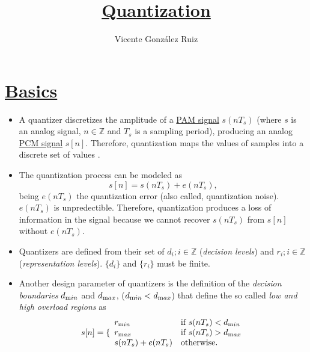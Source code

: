 
\title{\href{https://github.com/vicente-gonzalez-ruiz/quantization}{Quantization}}

\author{Vicente González Ruiz}

\maketitle

\section{\href{https://en.wikipedia.org/wiki/Quantization\_(signal\_processing)}{Basics}}
\begin{itemize}
\tightlist

\item
  A quantizer discretizes the amplitude of a
  \href{https://en.wikipedia.org/wiki/Pulse-amplitude_modulation}{PAM
    signal} \(s(nT_s)\) (where $s$ is an analog signal,
  $n\in{\mathbb{Z}}$ and $T_s$ is a sampling period), producing an
  analog
  \href{https://en.wikipedia.org/wiki/Pulse-code_modulation}{PCM
    signal} $s[n]$. Therefore, quantization maps the 
  values of samples into a discrete set of values
  \cite{vetterli1995wavelets}.

\item
  The quantization process can be modeled as
  \begin{equation}
    s[n] = s(nT_s) + e(nT_s),
  \end{equation}
  being \(e(nT_s)\) the quantization error (also called, quantization
  noise). $e(nT_s)$ is unpredectible. Therefore, quantization produces
  a loss of information in the signal because we cannot recover
  $s(nT_s)$ from $s[n]$ without $e(nT_s)$.

\item
  Quantizers are defined from their set of \(d_i; i\in {\mathbb{Z}}\)
  (\emph{decision levels}) and \(r_i; i\in {\mathbb{Z}}\)
  (\emph{representation levels}). $\{d_i\}$ and $\{r_i\}$ must be
  finite.

\item Another design parameter of quantizers is the definition of the
  \emph{decision boundaries} $d_{\text min}$ and $d_{\text max}$,
  ($d_{\text min}<d_{\text max}$) that define the so called \emph{low
    and high overload regions} as
  \begin{equation}
    s[n] = \{\begin{array}{ll}
    r_{\text min} & \text{if $s(nT_s)<d_{\text min}$} \\
    r_{\text max} & \text{if $s(nT_s)>d_{\text max}$} \\
    s(nT_s)+e(nT_s) & \text{otherwise}.
    \end{array}
  \end{equation}
  

\end{itemize}
